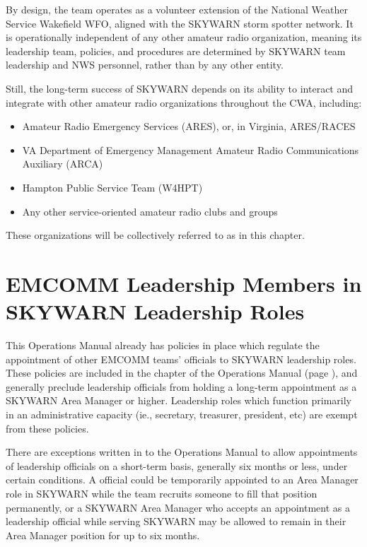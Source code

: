 \documentclass[pdflatex,letterpaper,twoside,12pt]{book}
\begin{document}
By design, the team operates as a volunteer extension of the National Weather Service Wakefield WFO, aligned with the SKYWARN storm spotter network.  It is operationally independent of any other amateur radio organization, meaning its leadership team, policies, and procedures are determined by SKYWARN team leadership and NWS personnel, rather than by any other entity.

Still, the long-term success of SKYWARN depends on its ability to interact and integrate with other amateur radio organizations throughout the CWA, including:

\begin{itemize}
\item Amateur Radio Emergency Services (ARES), or, in Virginia, ARES/RACES
\item VA Department of Emergency Management Amateur Radio Communications Auxiliary (ARCA)
\item Hampton Public Service Team (W4HPT)
\item Any other service-oriented amateur radio clubs and groups
\end{itemize}

These organizations will be collectively referred to as \tpteams in this chapter.


\section{EMCOMM Leadership Members in SKYWARN Leadership Roles}

This Operations Manual already has policies in place which regulate the appointment of other EMCOMM teams' officials to SKYWARN leadership roles.  These policies are included in the  chapter of the Operations Manual (page \pageref{skywarn-roles}), and generally preclude \tpteam leadership officials from holding a long-term appointment as a SKYWARN Area Manager or higher.  Leadership roles which function primarily in an administrative capacity (ie., secretary, treasurer, president, etc) are exempt from these policies.

There are exceptions written in to the Operations Manual to allow appointments of \tpteam leadership officials on a short-term basis, generally six months or less, under certain conditions.  A \tpteam official could be temporarily appointed to an Area Manager role in SKYWARN while the team recruits someone to fill that position permanently, or a SKYWARN Area Manager who accepts an appointment as a \tpteam leadership official while serving SKYWARN may be allowed to remain in their Area Manager position for up to six months.
\end{document}

